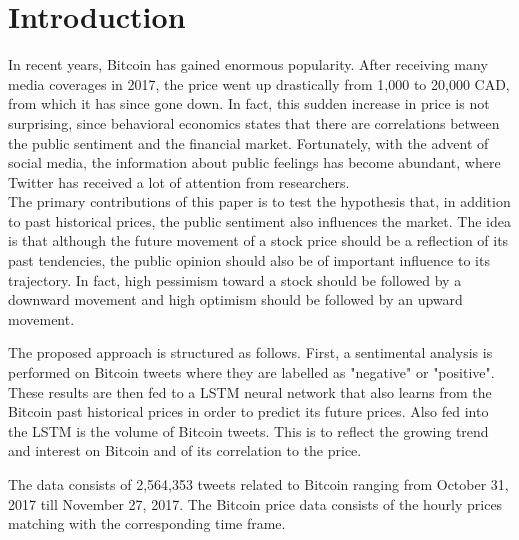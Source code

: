 \documentclass[conference]{IEEEtran}
\begin{document}
\section{Introduction}
\par In recent years, Bitcoin has gained enormous popularity. After receiving many media coverages in 2017, the price went up drastically from 1,000 to 20,000 CAD, from which it has since gone down. In fact, this sudden increase in price is not surprising, since behavioral economics states that there are correlations between the public sentiment and the financial market. Fortunately, with the advent of social media, the information about public feelings has become abundant, where Twitter has received a lot of attention from researchers. \\
	The primary contributions of this paper is to test the hypothesis that, in addition to past historical prices, the public sentiment also influences the market. The idea is that although the future movement of a stock price should be a reflection of its past tendencies, the public opinion should also be of important influence to its trajectory. In fact, high pessimism toward a stock should be followed by a downward movement and high optimism should be followed by an upward movement. 
\par The proposed approach is structured as follows. First, a sentimental analysis is  performed on Bitcoin tweets where they are labelled as "negative" or "positive". These results are then fed to a LSTM neural network that also learns from the Bitcoin past historical prices in order to predict its future prices. Also fed into the LSTM is the volume of Bitcoin tweets. This is to reflect the growing trend and interest on Bitcoin and of its correlation to the price.
\par	 The data consists of 2,564,353 tweets related to Bitcoin ranging from October 31, 2017 till November 27, 2017.    The Bitcoin price data consists of the hourly prices matching with the corresponding time frame.
	 
\end{document}
